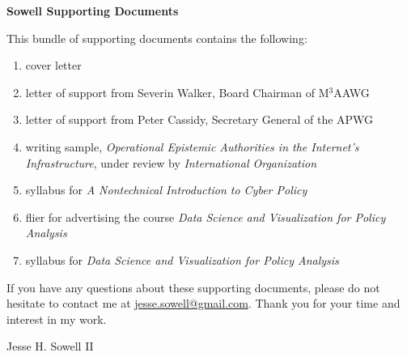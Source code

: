 \documentclass[11pt]{letter}
\begin{document}
\vspace{4\baselineskip}

\noindent
\textbf{Sowell Supporting Documents}

\noindent
This bundle of supporting documents contains the following:

\begin{enumerate}
  \item cover letter
  \item letter of support from Severin Walker, Board Chairman of M$^3$AAWG
  \item letter of support from Peter Cassidy, Secretary General of the APWG
  \item writing sample, \emph{Operational Epistemic Authorities in the Internet's Infrastructure}, under review by \emph{International Organization}
  \item syllabus for \emph{A Nontechnical Introduction to Cyber Policy}
  \item flier for advertising the course \emph{Data Science and Visualization for Policy Analysis}
  \item syllabus for \emph{Data Science and Visualization for Policy Analysis}
\end{enumerate}

\noindent
If you have any questions about these supporting documents, please do not hesitate to contact me at \href{mailto:jesse.sowell@gmail.com}{jesse.sowell@gmail.com}.  Thank you for your time and interest in my work.

\noindent
Jesse H. Sowell II
\end{document}
